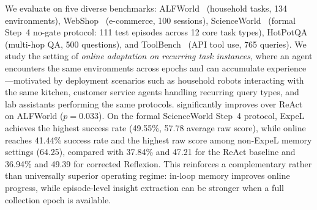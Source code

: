 We evaluate \method{} on five diverse benchmarks: ALFWorld~\citep{shridhar2021alfworld} (household tasks, 134 environments), WebShop~\citep{yao2022webshop} (e-commerce, 100 sessions), ScienceWorld~\citep{wang2022scienceworld} (formal Step~4 no-gate protocol: 111 test episodes across 12 core task types), HotPotQA~\citep{yang2018hotpotqa} (multi-hop QA, 500 questions), and ToolBench~\citep{qin2023toolllm} (API tool use, 765 queries). We study the setting of \emph{online adaptation on recurring task instances}, where an agent encounters the same environments across epochs and can accumulate experience---motivated by deployment scenarios such as household robots interacting with the same kitchen, customer service agents handling recurring query types, and lab assistants performing the same protocols. \method{} significantly improves over ReAct on ALFWorld ($p{=}0.033$). On the formal ScienceWorld Step~4 protocol, ExpeL achieves the highest success rate (49.55\%, 57.78 average raw score), while online \method{} reaches 41.44\% success rate and the highest raw score among non-ExpeL memory settings (64.25), compared with 37.84\% and 47.21 for the ReAct baseline and 36.94\% and 49.39 for corrected Reflexion. This reinforces a complementary rather than universally superior operating regime: in-loop memory improves online progress, while episode-level insight extraction can be stronger when a full collection epoch is available.

